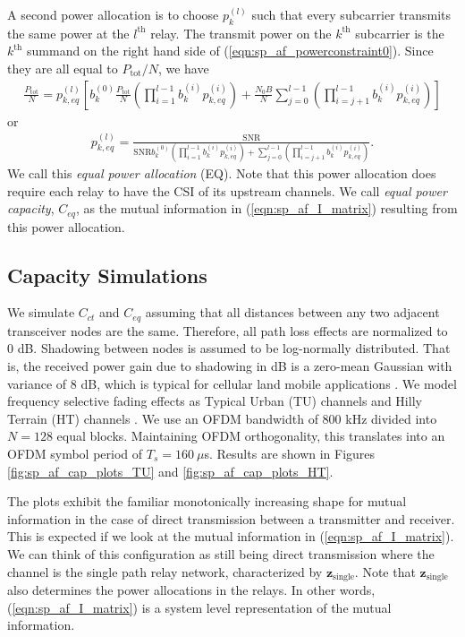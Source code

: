 A second power allocation is to choose $p_k^{(l)}$ such that every subcarrier transmits the same power at the $l^{\mbox{th}}$ relay.  The transmit power on the $k^{\mbox{th}}$ subcarrier is the $k^{\mbox{th}}$ summand on the right hand side of (\ref{eqn:sp_af_powerconstraint0}).  Since they are all equal to $P_{\mbox{tot}}/N$, we have
\begin{eqnarray}
\frac{P_{\mbox{tot}}}{N} = 
 p_{k,eq}^{(l)}
\left[b_k^{(0)} \frac{P_{\mbox{tot}}}{N}  \left( \displaystyle \prod_{i=1}^{l-1} b_k^{(i)} p_{k,eq}^{(i)} \right) + 
\frac{N_0 B}{N} \sum_{j=0}^{l-1} \left( \displaystyle \prod_{i=j+1}^{l-1} b_k^{(i)} p_{k,eq}^{(i)} \right) 
\right]\end{eqnarray}
or
\begin{eqnarray}
p_{k,eq}^{(l)} = \frac{\mbox{SNR}}
{\mbox{SNR} b_k^{(0)} \left( \displaystyle\prod_{i=1}^{l-1}b_k^{(i)} p_{k,eq}^{(i)} \right) + \displaystyle\sum_{j=0}^{l-1} \left(
\prod_{i=j+1}^{l-1}  b_k^{(i)} p_{k,eq}^{(i)}
\right)} \mbox{.}
\label{}
\end{eqnarray}
We call this \emph{equal power allocation} (EQ).  Note that this power allocation does require each relay to have the CSI of its upstream channels.  We call \emph{equal power capacity}, $C_{eq}$, as the mutual information in (\ref{eqn:sp_af_I_matrix}) resulting from this power allocation.

\subsection{Capacity Simulations}
\label{subsec:sp_af_cs}

We simulate $C_{ct}$ and $C_{eq}$ assuming that all distances between any two adjacent transceiver nodes are the same.  Therefore, all path loss effects are normalized to $0$ dB.  Shadowing between nodes is assumed to be log-normally distributed.  That is, the received power gain due to shadowing in dB is a zero-mean Gaussian with variance of 8 dB, which is typical for cellular land mobile applications \cite{book:Stuber01}.  We model frequency selective fading effects as Typical Urban (TU) channels and Hilly Terrain (HT) channels \cite{book:Stuber01}.  We use an OFDM bandwidth of 800 kHz divided into $N=128$ equal blocks.  Maintaining OFDM orthogonality, this translates into an OFDM symbol period of $T_s = 160\:\mu$s.  Results are shown in Figures \ref{fig:sp_af_cap_plots_TU} and  \ref{fig:sp_af_cap_plots_HT}.

The plots exhibit the familiar monotonically increasing shape for mutual information in the case of direct transmission between a transmitter and receiver.  This is expected if we look at the mutual information in (\ref{eqn:sp_af_I_matrix}).  We can think of this configuration as still being direct transmission where the channel is the single path relay network, characterized by $\mathbf{z}_{\mbox{single}}$.  Note that $\mathbf{z}_{\mbox{single}}$ also determines the power allocations in the relays.  In other words, (\ref{eqn:sp_af_I_matrix}) is a system level representation of the mutual information.

